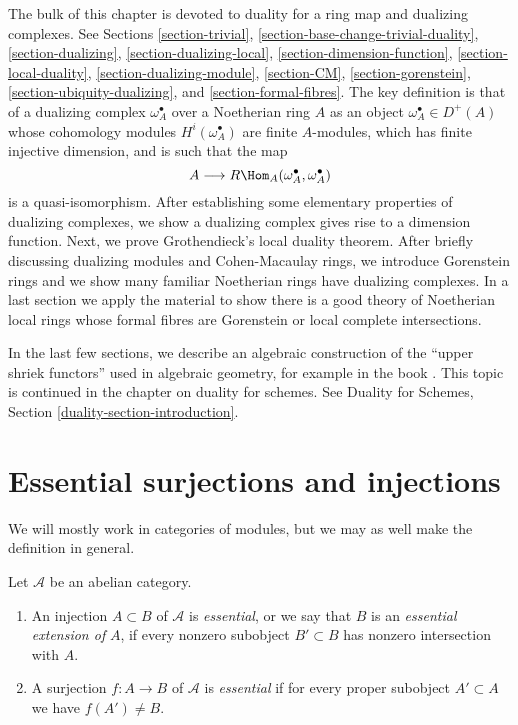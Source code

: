 \medskip\noindent
The bulk of this chapter is devoted to duality for a ring map and
dualizing complexes. See
Sections \ref{section-trivial},
\ref{section-base-change-trivial-duality},
\ref{section-dualizing},
\ref{section-dualizing-local},
\ref{section-dimension-function},
\ref{section-local-duality},
\ref{section-dualizing-module},
\ref{section-CM},
\ref{section-gorenstein},
\ref{section-ubiquity-dualizing}, and
\ref{section-formal-fibres}.
The key definition is that of a dualizing complex
$\omega_A^\bullet$ over a Noetherian ring $A$ as an object
$\omega_A^\bullet \in D^{+}(A)$ whose cohomology modules
$H^i(\omega_A^\bullet)$ are finite $A$-modules, which has
finite injective dimension, and is such that the map
$$
A \longrightarrow R\Hom_A(\omega_A^\bullet, \omega_A^\bullet)
$$
is a quasi-isomorphism. After establishing some elementary properties
of dualizing complexes, we show a dualizing complex gives rise to a
dimension function. Next, we prove Grothendieck's local duality theorem.
After briefly discussing dualizing modules and Cohen-Macaulay rings,
we introduce Gorenstein rings and we show many familiar Noetherian
rings have dualizing complexes. In a last section we apply the material
to show there is a good theory of Noetherian local rings whose formal fibres
are Gorenstein or local complete intersections.

\medskip\noindent
In the last few sections, we describe an algebraic construction of
the ``upper shriek functors'' used in algebraic geometry, for example
in the book \cite{RD}. This topic is continued in the chapter on
duality for schemes. See
Duality for Schemes, Section \ref{duality-section-introduction}.







\section{Essential surjections and injections}
\label{section-essential}

\noindent
We will mostly work in categories of modules, but we may as well make
the definition in general.

\begin{definition}
\label{definition-essential}
Let $\mathcal{A}$ be an abelian category.
\begin{enumerate}
\item An injection $A \subset B$ of $\mathcal{A}$ is {\it essential},
or we say that $B$ is an {\it essential extension of} $A$,
if every nonzero subobject $B' \subset B$ has nonzero intersection with $A$.
\item A surjection $f : A \to B$ of $\mathcal{A}$ is {\it essential}
if for every proper subobject $A' \subset A$ we have $f(A') \not = B$.
\end{enumerate}
\end{definition}

